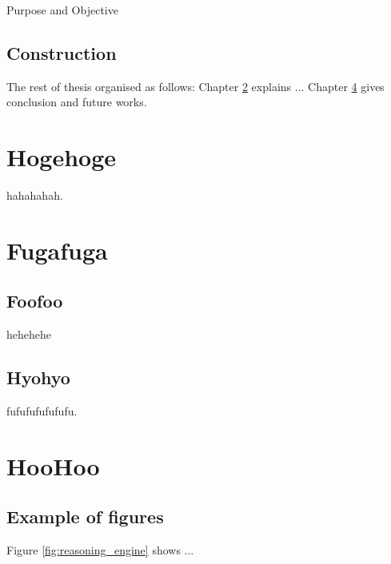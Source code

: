 \documentclass[12pt,dvipdfmx]{report}
\begin{document}
Purpose and Objective

\section{Construction}
The rest of thesis organised as follows:
Chapter \ref{chap:second} explains ... 
Chapter \ref{chap:third} gives conclusion and future works.


\chapter{Hogehoge} \label{chap:second}

hahahahah.

\chapter{Fugafuga}
\section{Foofoo}
hehehehe

\section{Hyohyo}

fufufufufufufu.

\chapter{HooHoo} \label{chap:third}

\section{Example of figures}

Figure \ref{fig:reasoning_engine} shows ...
\end{document}
